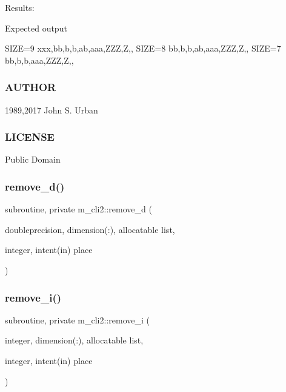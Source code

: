 Results\+:

Expected output

S\+I\+ZE=9 xxx,bb,b,b,ab,aaa,Z\+ZZ,Z,, S\+I\+ZE=8 bb,b,b,ab,aaa,Z\+ZZ,Z,, S\+I\+ZE=7 bb,b,b,aaa,Z\+ZZ,Z,,

\subsubsection*{A\+U\+T\+H\+OR}

1989,2017 John S. Urban \subsubsection*{L\+I\+C\+E\+N\+SE}

Public Domain \mbox{\label{namespacem__cli2_a5deb6a427a39e04c5a18a82497d5cf84}} 
\subsubsection{\texorpdfstring{remove\+\_\+d()}{remove\_d()}}
{\footnotesize\ttfamily subroutine, private m\+\_\+cli2\+::remove\+\_\+d (\begin{DoxyParamCaption}\item[{doubleprecision, dimension(\+:), allocatable}]{list,  }\item[{integer, intent(in)}]{place }\end{DoxyParamCaption})\hspace{0.3cm}{\ttfamily [private]}}

\mbox{\label{namespacem__cli2_a1c2bd26b3c04a499cc65b00133dfe6b9}} 
\subsubsection{\texorpdfstring{remove\+\_\+i()}{remove\_i()}}
{\footnotesize\ttfamily subroutine, private m\+\_\+cli2\+::remove\+\_\+i (\begin{DoxyParamCaption}\item[{integer, dimension(\+:), allocatable}]{list,  }\item[{integer, intent(in)}]{place }\end{DoxyParamCaption})\hspace{0.3cm}{\ttfamily [private]}}

